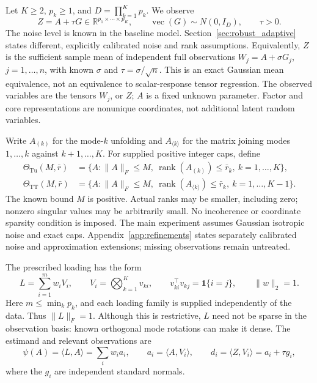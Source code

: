 \documentclass[11pt]{article}
\theoremstyle{remark}
\newcommand{\R}{\mathbb R}
\newcommand{\ip}[2]{\langle #1,#2\rangle}
\newcommand{\norm}[1]{\lVert #1\rVert}
\newcommand{\rank}{\operatorname{rank}}
\newcommand{\Tu}{\mathrm{Tu}}
\newcommand{\TT}{\mathrm{TT}}
\begin{document}
Let $K\ge2$, $p_k\ge1$, and $D=\prod_{k=1}^K p_k$. We observe
\begin{equation}\label{eq:model}
 Z=A+\tau G\in\R^{p_1\times\cdots\times p_K},\qquad
 \operatorname{vec}(G)\sim N(0,I_D),\qquad \tau>0.
\end{equation}
The noise level is known in the baseline model. Section~\ref{sec:robust_adaptive} states different, explicitly calibrated noise and rank assumptions. Equivalently, $Z$ is the sufficient sample mean of independent full observations $W_j=A+\sigma G_j$, $j=1,\ldots,n$, with known $\sigma$ and $\tau=\sigma/\sqrt n$. This is an exact Gaussian mean equivalence, not an equivalence to scalar-response tensor regression. The observed variables are the tensors $W_j$, or $Z$; $A$ is a fixed unknown parameter. Factor and core representations are nonunique coordinates, not additional latent random variables.

Write $A_{(k)}$ for the mode-$k$ unfolding and $A_{\langle k\rangle}$ for the matrix joining modes $1,\ldots,k$ against $k+1,\ldots,K$. For supplied positive integer caps, define
\begin{align}
 \Theta_{\Tu}(M,\bar r)&=\{A:\norm A_F\le M,\ \rank(A_{(k)})\le\bar r_k,\ k=1,\ldots,K\},\label{eq:tucker}\\
 \Theta_{\TT}(M,\bar r)&=\{A:\norm A_F\le M,\ \rank(A_{\langle k\rangle})\le\bar r_k,\ k=1,\ldots,K-1\}.\label{eq:tt}
\end{align}
The known bound $M$ is positive. Actual ranks may be smaller, including zero; nonzero singular values may be arbitrarily small. No incoherence or coordinate sparsity condition is imposed. The main experiment assumes Gaussian isotropic noise and exact caps. Appendix~\ref{app:refinements} states separately calibrated noise and approximation extensions; missing observations remain untreated.

The prescribed loading has the form
\begin{equation}\label{eq:loading}
 L=\sum_{i=1}^m w_i V_i,\qquad
 V_i=\bigotimes_{k=1}^K v_{ki},\qquad
 v_{ki}^\top v_{kj}=\mathbf1\{i=j\},\qquad \norm w_2=1.
\end{equation}
Here $m\le\min_k p_k$, and each loading family is supplied independently of the data. Thus $\norm L_F=1$. Although this is restrictive, $L$ need not be sparse in the observation basis: known orthogonal mode rotations can make it dense. The estimand and relevant observations are
\begin{equation}\label{eq:diagonal}
 \psi(A)=\ip LA=\sum_iw_i a_i,\qquad
 a_i=\ip A{V_i},\qquad d_i=\ip Z{V_i}=a_i+\tau g_i,
\end{equation}
where the $g_i$ are independent standard normals.
\end{document}

